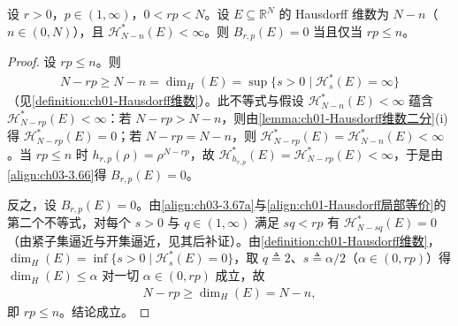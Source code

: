 \documentclass[../../main.tex]{subfiles}%
\begin{document}
\begin{corollary}\label{corollary:ch03-Hausdorff维数}
设 $r>0$，$p\in(1,\infty)$，$0<rp<N$。设 $E\subseteq\mathbb{R}^N$ 的 Hausdorff 维数为 $N-n$（$n\in(0,N)$），且 $\mathcal{H}^*_{N-n}(E)<\infty$。则 $B_{r,p}(E)=0$ 当且仅当 $rp\leqslant n$。
\end{corollary}

\begin{proof}
设 $rp\leqslant n$。则
\begin{align*}
N-rp\geqslant N-n=\dim_H(E)=\sup\{s>0\mid\mathcal{H}^*_s(E)=\infty\}
\end{align*}
（见\cref{definition:ch01-Hausdorff维数}）。此不等式与假设 $\mathcal{H}^*_{N-n}(E)<\infty$ 蕴含 $\mathcal{H}^*_{N-rp}(E)<\infty$：若 $N-rp>N-n$，则由\cref{lemma:ch01-Hausdorff维数二分}(i)得 $\mathcal{H}^*_{N-rp}(E)=0$；若 $N-rp=N-n$，则 $\mathcal{H}^*_{N-rp}(E)=\mathcal{H}^*_{N-n}(E)<\infty$。当 $rp\leqslant n$ 时 $h_{r,p}(\rho)=\rho^{N-rp}$，故 $\mathcal{H}^*_{h_{r,p}}(E)=\mathcal{H}^*_{N-rp}(E)<\infty$，于是由\eqref{align:ch03-3.66}得 $B_{r,p}(E)=0$。

反之，设 $B_{r,p}(E)=0$。由\eqref{align:ch03-3.67a}与\eqref{align:ch01-Hausdorff局部等价}的第二个不等式，对每个 $s>0$ 与 $q\in(1,\infty)$ 满足 $sq<rp$ 有 $\mathcal{H}^*_{N-sq}(E)=0$（由紧子集逼近与开集逼近，见其后补证）。由\cref{definition:ch01-Hausdorff维数}，$\dim_H(E)=\inf\{s>0\mid\mathcal{H}^*_s(E)=0\}$，取 $q\triangleq2$、$s\triangleq\alpha/2$（$\alpha\in(0,rp)$）得 $\dim_H(E)\leqslant\alpha$ 对一切 $\alpha\in(0,rp)$ 成立，故
\begin{align*}
N-rp\geqslant\dim_H(E)=N-n,
\end{align*}
即 $rp\leqslant n$。结论成立。
\end{proof}
\end{document}
